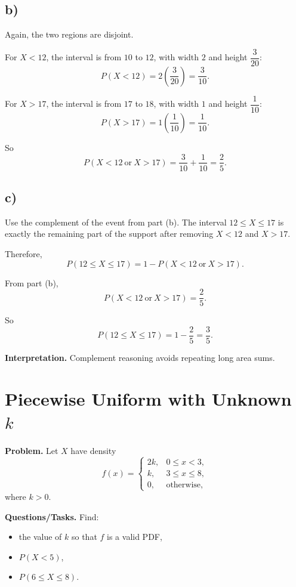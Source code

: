 \subsection*{b)}
Again, the two regions are disjoint.

For $X<12$, the interval is from $10$ to $12$, with width $2$ and height $\dfrac{3}{20}$:
\[
P(X<12)=2\left(\frac{3}{20}\right)=\frac{3}{10}.
\]

For $X>17$, the interval is from $17$ to $18$, with width $1$ and height $\dfrac{1}{10}$:
\[
P(X>17)=1\left(\frac{1}{10}\right)=\frac{1}{10}.
\]

So
\[
P(X<12\ \text{or}\ X>17)=\frac{3}{10}+\frac{1}{10}=\frac{2}{5}.
\]


\subsection*{c)}
Use the complement of the event from part (b). The interval $12\le X\le 17$ is exactly the remaining part of the support after removing $X<12$ and $X>17$.

Therefore,
\[
P(12\le X\le 17)=1-P(X<12\ \text{or}\ X>17).
\]

From part (b),
\[
P(X<12\ \text{or}\ X>17)=\frac{2}{5}.
\]

So
\[
P(12\le X\le 17)=1-\frac{2}{5}=\frac{3}{5}.
\]


\textbf{Interpretation.}
Complement reasoning avoids repeating long area sums.

\section{Piecewise Uniform with Unknown $k$}

\textbf{Problem.}
Let $X$ have density
\[
f(x)=
\begin{cases}
	2k, & 0\le x<3,\\
	k, & 3\le x\le 8,\\
	0, & \text{otherwise,}
\end{cases}
\]
where $k>0$.

\textbf{Questions/Tasks.}
Find:
\begin{itemize}
	\item[(a)] the value of $k$ so that $f$ is a valid PDF,
	\item[(b)] $P(X<5)$,
	\item[(c)] $P(6\le X\le 8)$.
\end{itemize}

